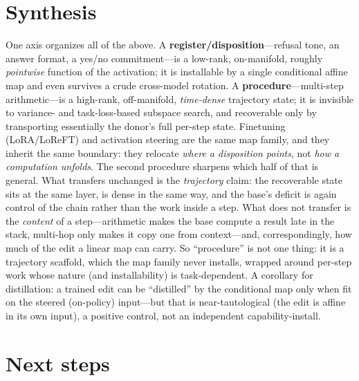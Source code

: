\documentclass{article}
\begin{document}
\section{Synthesis}

One axis organizes all of the above. A \textbf{register/disposition}---refusal tone, an answer format,
a yes/no commitment---is a low-rank, on-manifold, roughly \emph{pointwise} function of the activation;
it is installable by a single conditional affine map and even survives a crude cross-model rotation. A
\textbf{procedure}---multi-step arithmetic---is a high-rank, off-manifold, \emph{time-dense} trajectory
state; it is invisible to variance- and task-loss-based subspace search, and recoverable only by
transporting essentially the donor's full per-step state. Finetuning (LoRA/LoReFT) and activation
steering are the same map family, and they inherit the same boundary: they relocate \emph{where a
disposition points}, not \emph{how a computation unfolds}. The second procedure sharpens which half of
that is general. What transfers unchanged is the \emph{trajectory} claim: the recoverable state sits at
the same layer, is dense in the same way, and the base's deficit is again control of the chain rather
than the work inside a step. What does not transfer is the \emph{content} of a step---arithmetic makes
the base compute a result late in the stack, multi-hop only makes it copy one from context---and,
correspondingly, how much of the edit a linear map can carry. So ``procedure'' is not one thing: it is
a trajectory scaffold, which the map family never installs, wrapped around per-step work whose nature
(and installability) is task-dependent. A corollary for distillation: a trained edit
can be ``distilled'' by the conditional map only when fit on the steered (on-policy) input---but that
is near-tautological (the edit is affine in its own input), a positive control, not an independent
capability-install.

\section{Next steps}
\label{sec:next}
\end{document}
